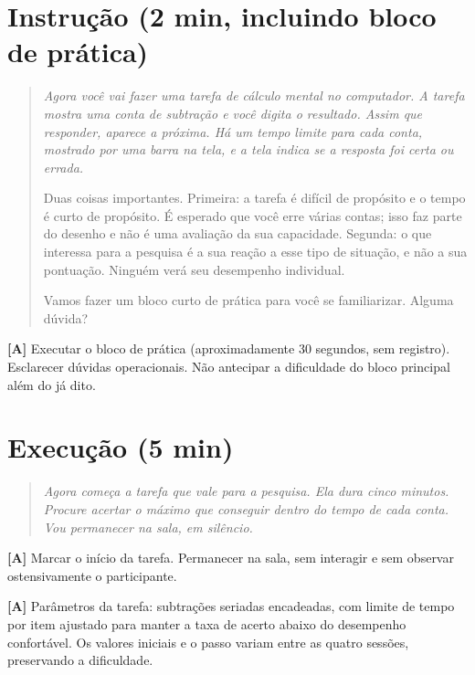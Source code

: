 \section*{Instrução (2 min, incluindo bloco de prática)}

\begin{quote}\itshape
Agora você vai fazer uma tarefa de cálculo mental no computador. A tarefa mostra uma conta de subtração e você digita o resultado. Assim que responder, aparece a próxima. Há um tempo limite para cada conta, mostrado por uma barra na tela, e a tela indica se a resposta foi certa ou errada.

Duas coisas importantes. Primeira: a tarefa é difícil de propósito e o tempo é curto de propósito. É esperado que você erre várias contas; isso faz parte do desenho e não é uma avaliação da sua capacidade. Segunda: o que interessa para a pesquisa é a sua reação a esse tipo de situação, e não a sua pontuação. Ninguém verá seu desempenho individual.

Vamos fazer um bloco curto de prática para você se familiarizar. Alguma dúvida?
\end{quote}

\noindent\textbf{[A]} Executar o bloco de prática (aproximadamente 30 segundos, sem registro). Esclarecer dúvidas operacionais. Não antecipar a dificuldade do bloco principal além do já dito.

\section*{Execução (5 min)}

\begin{quote}\itshape
Agora começa a tarefa que vale para a pesquisa. Ela dura cinco minutos. Procure acertar o máximo que conseguir dentro do tempo de cada conta. Vou permanecer na sala, em silêncio.
\end{quote}

\noindent\textbf{[A]} Marcar o início da tarefa. Permanecer na sala, sem interagir e sem observar ostensivamente o participante.

\noindent\textbf{[A]} Parâmetros da tarefa: subtrações seriadas encadeadas, com limite de tempo por item ajustado para manter a taxa de acerto abaixo do desempenho confortável. Os valores iniciais e o passo variam entre as quatro sessões, preservando a dificuldade. 

